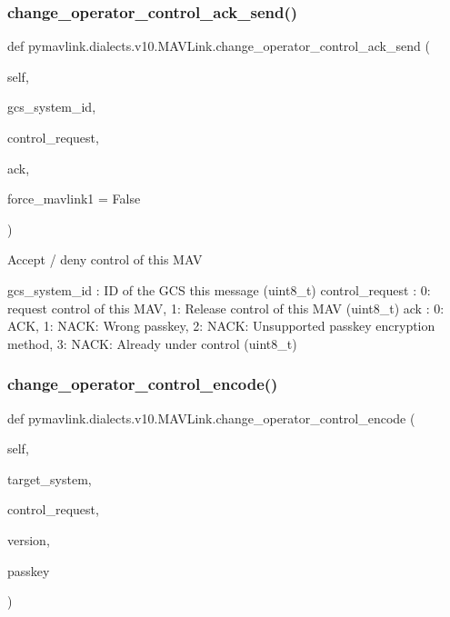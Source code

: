 \begin{DoxyVerb}
\begin{DoxyVerb}
\subsubsection{\texorpdfstring{change\+\_\+operator\+\_\+control\+\_\+ack\+\_\+send()}{change\_operator\_control\_ack\_send()}}
{\footnotesize\ttfamily def pymavlink.\+dialects.\+v10.\+M\+A\+V\+Link.\+change\+\_\+operator\+\_\+control\+\_\+ack\+\_\+send (\begin{DoxyParamCaption}\item[{}]{self,  }\item[{}]{gcs\+\_\+system\+\_\+id,  }\item[{}]{control\+\_\+request,  }\item[{}]{ack,  }\item[{}]{force\+\_\+mavlink1 = {\ttfamily False} }\end{DoxyParamCaption})}

\begin{DoxyVerb}Accept / deny control of this MAV

gcs_system_id             : ID of the GCS this message (uint8_t)
control_request           : 0: request control of this MAV, 1: Release control of this MAV (uint8_t)
ack                       : 0: ACK, 1: NACK: Wrong passkey, 2: NACK: Unsupported passkey encryption method, 3: NACK: Already under control (uint8_t)\end{DoxyVerb}
 \mbox{\label{classpymavlink_1_1dialects_1_1v10_1_1MAVLink_aec5eaad4becad783155f53366bc0ba8c}} 
\subsubsection{\texorpdfstring{change\+\_\+operator\+\_\+control\+\_\+encode()}{change\_operator\_control\_encode()}}
{\footnotesize\ttfamily def pymavlink.\+dialects.\+v10.\+M\+A\+V\+Link.\+change\+\_\+operator\+\_\+control\+\_\+encode (\begin{DoxyParamCaption}\item[{}]{self,  }\item[{}]{target\+\_\+system,  }\item[{}]{control\+\_\+request,  }\item[{}]{version,  }\item[{}]{passkey }\end{DoxyParamCaption})}


\end{DoxyVerb}
\end{DoxyVerb}
